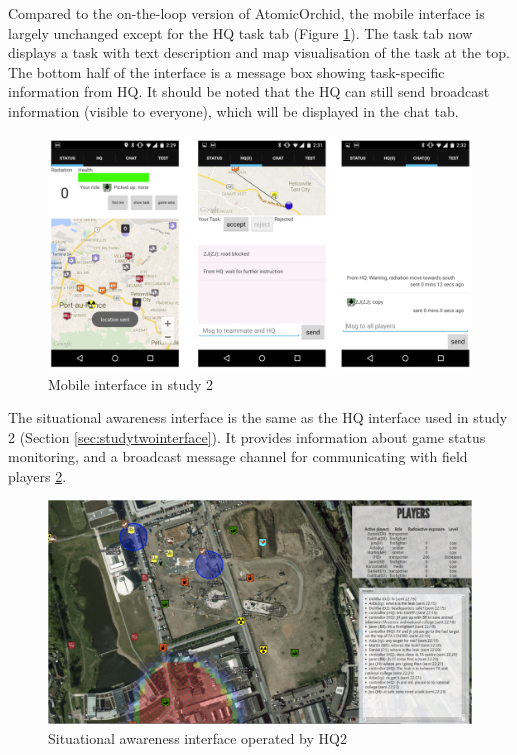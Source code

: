 Compared to the on-the-loop version of AtomicOrchid, the mobile interface is largely unchanged except for the HQ task tab (Figure \ref{fig:study3mobileInterface}). The task tab now displays a task with text description and map visualisation of the task at the top. The bottom half of the interface is a message box showing task-specific information from HQ. It should be noted that the HQ can still send broadcast information (visible to everyone), which will be displayed in the chat tab. \\

\begin{figure}[h]
  \centering
  \includegraphics[width=1\textwidth]{img/study3/system/mobileInterface}
  \caption{Mobile interface in study 2}
  \label{fig:study3mobileInterface}
\end{figure}

The situational awareness interface is the same as the HQ interface used in study 2 (Section \ref{sec:studytwointerface}). It provides information about game status monitoring, and a broadcast message channel for communicating with field players \ref{fig:study3SAinterface}.\\

\begin{figure}[h]
  \centering
  \includegraphics[width=1\textwidth]{img/study3/system/HQ2Interface}
  \caption{Situational awareness interface operated by HQ2}
  \label{fig:study3SAinterface}
\end{figure}

